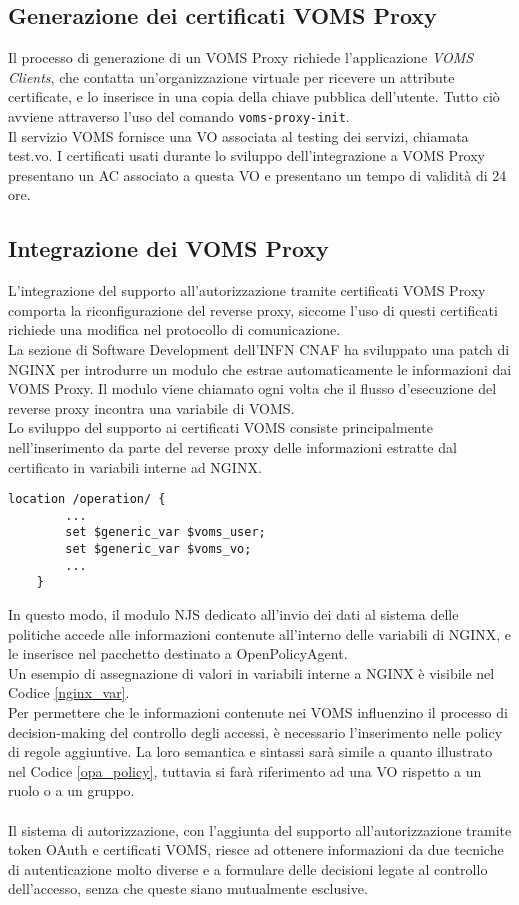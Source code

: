 \subsection{Generazione dei certificati VOMS Proxy}
Il processo di generazione di un VOMS Proxy richiede l'applicazione \textit{VOMS Clients}, che contatta un'organizzazione virtuale per ricevere un attribute 
certificate, e lo inserisce in una copia della chiave pubblica dell'utente. Tutto ciò avviene attraverso l'uso del comando \texttt{voms-proxy-init}. 
\\Il servizio VOMS fornisce una VO associata al testing dei servizi, chiamata test.vo. I certificati usati durante lo sviluppo 
dell'integrazione a VOMS Proxy presentano un AC associato a questa VO e presentano un tempo di validità di 24 ore.   

\subsection{Integrazione dei VOMS Proxy}
L'integrazione del supporto all'autorizzazione tramite certificati VOMS Proxy comporta la riconfigurazione del reverse proxy, 
siccome l'uso di questi certificati richiede una modifica nel protocollo di comunicazione. 
\\ La sezione di Software Development dell'INFN CNAF ha sviluppato una patch di NGINX per introdurre un modulo che estrae automaticamente le informazioni dai VOMS Proxy.
 Il modulo viene chiamato ogni volta che il flusso d'esecuzione del reverse proxy incontra una variabile di VOMS.
\\ Lo sviluppo del supporto ai certificati VOMS consiste principalmente nell'inserimento da parte del reverse proxy 
delle informazioni estratte dal certificato in variabili interne ad NGINX. 

\begin{lstlisting}[caption={Assegnazione di variabili in NGINX},captionpos=b,label=nginx_var]
    location /operation/ {
        ...
        set $generic_var $voms_user;
        set $generic_var $voms_vo;
        ...
    }
\end{lstlisting}
In questo modo, il modulo NJS 
dedicato all'invio dei dati al sistema delle politiche accede alle informazioni 
contenute all'interno delle variabili di NGINX, 
e le inserisce nel pacchetto destinato a OpenPolicyAgent. 
\\Un esempio di assegnazione di valori in variabili interne a 
NGINX è visibile nel Codice \ref{nginx_var}.
\\ Per permettere che le informazioni contenute nei VOMS influenzino il processo di decision-making del controllo degli accessi,
 è necessario l'inserimento nelle policy di regole aggiuntive. La loro semantica e sintassi sarà simile a quanto illustrato nel Codice \ref*{opa_policy},
tuttavia si farà riferimento ad una VO rispetto a un ruolo o a un gruppo.
\\ \\ Il sistema di autorizzazione, con l'aggiunta del supporto all'autorizzazione tramite token OAuth e certificati VOMS, riesce ad ottenere informazioni 
da due tecniche di autenticazione molto diverse e a formulare delle decisioni legate al controllo dell'accesso, senza che queste siano mutualmente esclusive. 

